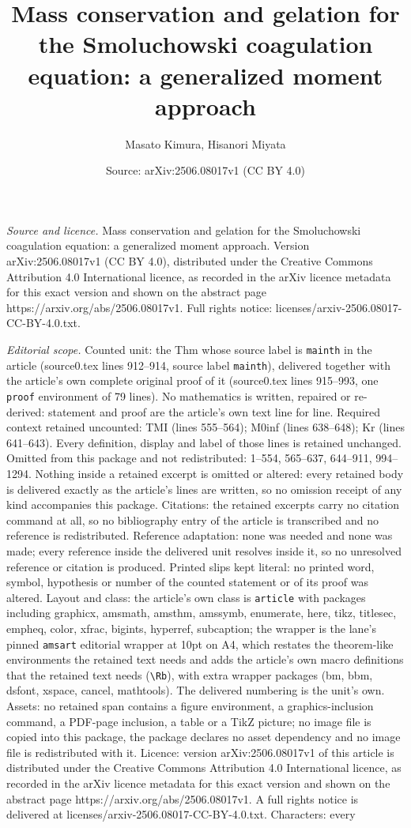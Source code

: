 \documentclass[10pt,a4paper]{amsart}
\title[Mass conservation and gelation for the Smoluchowski coagulat]{Mass conservation and gelation for the Smoluchowski coagulation equation: a generalized moment approach}
\author{Masato Kimura, Hisanori Miyata}
\date{Source: arXiv:2506.08017v1 (CC BY 4.0)}
\begin{document}
\maketitle

\noindent\emph{Source and licence.} Mass conservation and gelation for the Smoluchowski coagulation equation: a generalized moment approach. Version arXiv:2506.08017v1 (CC BY 4.0), distributed under the Creative Commons Attribution 4.0 International licence, as recorded in the arXiv licence metadata for this exact version and shown on the abstract page https://arxiv.org/abs/2506.08017v1. Full rights notice: licenses/arxiv-2506.08017-CC-BY-4.0.txt.\par\smallskip

\noindent\textit{Editorial scope.} Counted unit: the Thm whose source label is \texttt{mainth} in the article (source0.tex lines 912--914, source label \texttt{mainth}), delivered together with the article's own complete original proof of it (source0.tex lines 915--993, one \texttt{proof} environment of 79 lines). No mathematics is written, repaired or re-derived: statement and proof are the article's own text line for line. Required context retained uncounted: TMI (lines 555--564); M0inf (lines 638--648); Kr (lines 641--643). Every definition, display and label of those lines is retained unchanged. Omitted from this package and not redistributed: 1--554, 565--637, 644--911, 994--1294. Nothing inside a retained excerpt is omitted or altered: every retained body is delivered exactly as the article's lines are written, so no omission receipt of any kind accompanies this package. Citations: the retained excerpts carry no citation command at all, so no bibliography entry of the article is transcribed and no reference is redistributed. Reference adaptation: none was needed and none was made; every reference inside the delivered unit resolves inside it, so no unresolved reference or citation is produced. Printed slips kept literal: no printed word, symbol, hypothesis or number of the counted statement or of its proof was altered. Layout and class: the article's own class is \texttt{article} with packages including graphicx, amsmath, amsthm, amssymb, enumerate, here, tikz, titlesec, empheq, color, xfrac, bigints, hyperref, subcaption; the wrapper is the lane's pinned \texttt{amsart} editorial wrapper at 10pt on A4, which restates the theorem-like environments the retained text needs and adds the article's own macro definitions that the retained text needs (\texttt{\textbackslash Rb}), with extra wrapper packages (bm, bbm, dsfont, xspace, cancel, mathtools). The delivered numbering is the unit's own. Assets: no retained span contains a figure environment, a graphics-inclusion command, a PDF-page inclusion, a table or a TikZ picture; no image file is copied into this package, the package declares no asset dependency and no image file is redistributed with it. Licence: version arXiv:2506.08017v1 of this article is distributed under the Creative Commons Attribution 4.0 International licence, as recorded in the arXiv licence metadata for this exact version and shown on the abstract page https://arxiv.org/abs/2506.08017v1. A full rights notice is delivered at licenses/arxiv-2506.08017-CC-BY-4.0.txt. Characters: every 
\end{document}
